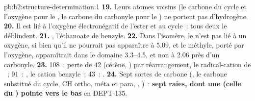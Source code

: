 \begin{solution}{pb:b2:structure-determination:1}
\textbf{19.} Leurs atomes voisins (le carbone du cycle et l'oxygène pour le , le carbone du
carbonyle pour le ) ne portent pas d'hydrogène.
\textbf{20.} Il est lié à l'oxygène électronégatif de l'ester et au cycle~: tous deux le déblindent.
\textbf{21.} , l'éthanoate de benzyle.
\textbf{22.} Dans l'isomère, le  n'est pas lié à un oxygène, si bien qu'il ne pourrait pas apparaître à
5.09, et le méthyle, porté par l'oxygène, apparaîtrait dans le domaine 3.3--4.5, et non à 2.06 près d'un
carbonyle.
\textbf{23.} 108~: perte de 42 (cétène, ) par réarrangement, le radical-cation de
~; 91~: , le cation benzyle~; 43~: .
\textbf{24.} Sept sortes de carbone (, le carbone substitué du cycle, CH ortho, méta et para,
, )~: \textbf{sept raies, dont une (celle du ) pointe vers le bas} en DEPT-135.
\end{solution}
